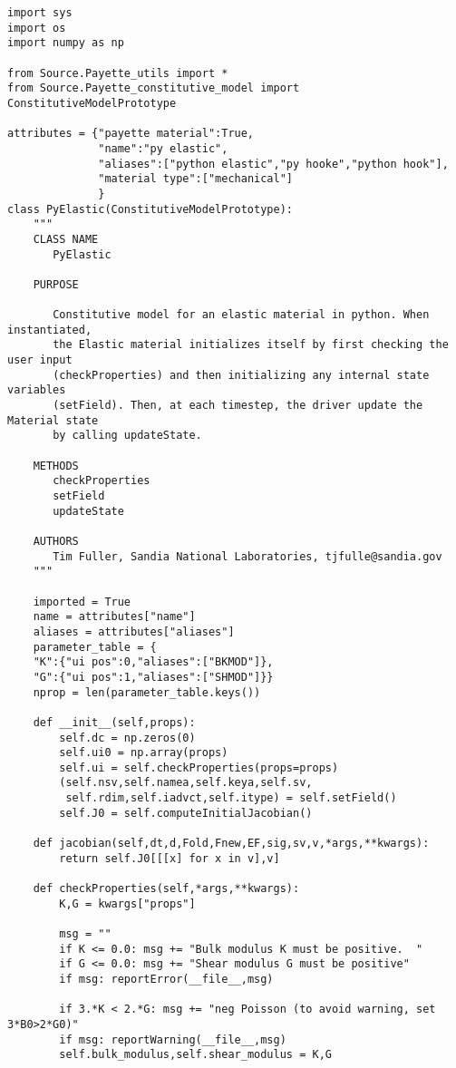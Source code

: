\documentclass[11pt]{article}
\begin{document}
\begin{verbatim}
import sys
import os
import numpy as np

from Source.Payette_utils import *
from Source.Payette_constitutive_model import ConstitutiveModelPrototype

attributes = {"payette material":True,
              "name":"py elastic",
              "aliases":["python elastic","py hooke","python hook"],
              "material type":["mechanical"]
              }
class PyElastic(ConstitutiveModelPrototype):
    """
    CLASS NAME
       PyElastic

    PURPOSE

       Constitutive model for an elastic material in python. When instantiated,
       the Elastic material initializes itself by first checking the user input
       (checkProperties) and then initializing any internal state variables
       (setField). Then, at each timestep, the driver update the Material state
       by calling updateState.

    METHODS
       checkProperties
       setField
       updateState

    AUTHORS
       Tim Fuller, Sandia National Laboratories, tjfulle@sandia.gov
    """

    imported = True
    name = attributes["name"]
    aliases = attributes["aliases"]
    parameter_table = {
    "K":{"ui pos":0,"aliases":["BKMOD"]},
    "G":{"ui pos":1,"aliases":["SHMOD"]}}
    nprop = len(parameter_table.keys())

    def __init__(self,props):
        self.dc = np.zeros(0)
        self.ui0 = np.array(props)
        self.ui = self.checkProperties(props=props)
        (self.nsv,self.namea,self.keya,self.sv,
         self.rdim,self.iadvct,self.itype) = self.setField()
        self.J0 = self.computeInitialJacobian()

    def jacobian(self,dt,d,Fold,Fnew,EF,sig,sv,v,*args,**kwargs):
        return self.J0[[[x] for x in v],v]

    def checkProperties(self,*args,**kwargs):
        K,G = kwargs["props"]

        msg = ""
        if K <= 0.0: msg += "Bulk modulus K must be positive.  "
        if G <= 0.0: msg += "Shear modulus G must be positive"
        if msg: reportError(__file__,msg)

        if 3.*K < 2.*G: msg += "neg Poisson (to avoid warning, set 3*B0>2*G0)"
        if msg: reportWarning(__file__,msg)
        self.bulk_modulus,self.shear_modulus = K,G


\end{verbatim}
\end{document}
